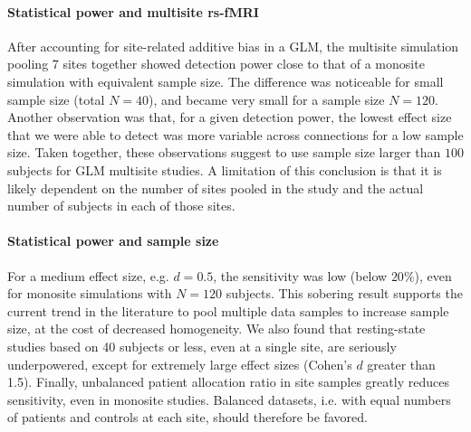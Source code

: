 \documentclass[authoryear]{elsarticle}
\begin{document}
\paragraph{Statistical power and multisite rs-fMRI} After accounting for site-related additive bias in a GLM, the multisite simulation pooling 7 sites together showed detection power close to that of a monosite simulation with equivalent sample size. The difference was noticeable for small sample size (total $N=40$), and became very small for a sample size $N=120$. Another observation was that, for a given detection power, the lowest effect size that we were able to detect was more variable across connections for a low sample size. Taken together, these observations suggest to use sample size larger than $100$ subjects for GLM multisite studies. A limitation of this conclusion is that it is likely dependent on the number of sites pooled in the study and the actual number of subjects in each of those sites. 

\paragraph{Statistical power and sample size} For a medium effect size, e.g. $d=0.5$, the sensitivity was low (below $20\%$), even for monosite simulations with $N=120$ subjects. This sobering result supports the current trend in the literature to pool multiple data samples to increase sample size, at the cost of decreased homogeneity. We also found that resting-state studies based on 40 subjects or less, even at a single site, are seriously underpowered, except for extremely large effect sizes (Cohen's $d$ greater than 1.5). Finally, unbalanced patient allocation ratio in site samples greatly reduces sensitivity, even in monosite studies. Balanced datasets, i.e. with equal numbers of patients and controls at each site, should therefore be favored. 
\end{document}
